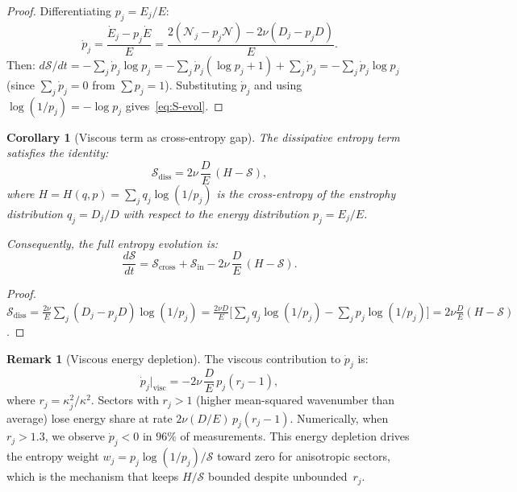 \documentclass[11pt]{article}
\newtheorem{corollary}[theorem]{Corollary}
\theoremstyle{definition}
\newtheorem{remark}[theorem]{Remark}
\newcommand{\cS}{\mathcal{S}}
\newcommand{\cN}{\mathcal{N}}
\begin{document}
\begin{proof}
Differentiating $p_j = E_j/E$:
\begin{equation}
\dot{p}_j = \frac{\dot{E}_j - p_j\dot{E}}{E}
= \frac{2(\cN_j - p_j\cN) - 2\nu(D_j - p_j D)}{E}.
\end{equation}
Then:
$d\cS/dt = -\sum_j \dot{p}_j\log p_j
= -\sum_j \dot{p}_j(\log p_j + 1) + \sum_j\dot{p}_j
= -\sum_j \dot{p}_j\log p_j$
(since $\sum_j\dot{p}_j = 0$ from $\sum p_j = 1$).
Substituting $\dot{p}_j$ and using
$\log(1/p_j) = -\log p_j$ gives~\eqref{eq:S-evol}.
\end{proof}

\begin{corollary}[Viscous term as cross-entropy gap]
\label{cor:viscous-identity}
The dissipative entropy term satisfies the identity:
\begin{equation}\label{eq:Sdiss-H}
\cS_{\mathrm{diss}} = 2\nu\,\frac{D}{E}\,(H - \cS),
\end{equation}
where $H = H(q,p) = \sum_j q_j\log(1/p_j)$ is the
cross-entropy of the enstrophy distribution $q_j = D_j/D$
with respect to the energy distribution $p_j = E_j/E$.

Consequently, the full entropy evolution is:
\begin{equation}\label{eq:S-evol-H}
\frac{d\cS}{dt} = \cS_{\mathrm{cross}}
+ \cS_{\mathrm{in}}
- 2\nu\,\frac{D}{E}\,(H - \cS).
\end{equation}
\end{corollary}

\begin{proof}
$\cS_{\mathrm{diss}}
= \frac{2\nu}{E}\sum_j(D_j - p_j D)\log(1/p_j)
= \frac{2\nu D}{E}\bigl[
\sum_j q_j\log(1/p_j)
- \sum_j p_j\log(1/p_j)\bigr]
= 2\nu\frac{D}{E}(H - \cS)$.
\end{proof}

\begin{remark}[Viscous energy depletion]
\label{rem:visc-depletion}
The viscous contribution to $\dot{p}_j$ is:
\begin{equation}\label{eq:dpj-visc}
\dot{p}_j\big|_{\mathrm{visc}} =
-2\nu\,\frac{D}{E}\,p_j(r_j - 1),
\end{equation}
where $r_j = \kappa_j^2/\kappa^2$.  Sectors with
$r_j > 1$ (higher mean-squared wavenumber than average)
lose energy share at rate $2\nu(D/E)\,p_j(r_j - 1)$.
Numerically, when $r_j > 1.3$, we observe
$\dot{p}_j < 0$ in $96\%$ of measurements.
This energy depletion drives the entropy weight
$w_j = p_j\log(1/p_j)/\cS$ toward zero for anisotropic
sectors, which is the mechanism that keeps $H/\cS$
bounded despite unbounded~$r_j$.
\end{remark}
\end{document}
